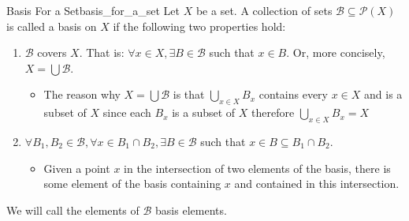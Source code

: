 \begin{definition}
{Basis For a Set}{basis_for_a_set}
Let \(X\) be a set. A collection of sets \(\mathcal{B} \subseteq
\mathcal{P}(X)\) is called a basis on \(X\) if the following two properties
hold:
\begin{enumerate}
    \item \(\mathcal{B}\) covers \(X\). That is: \(\forall x \in X, \exists B
    \in \mathcal{B}\) such that \(x \in B \). Or, more concisely, \(X = \bigcup
    \mathcal{B}\).
        \begin{itemize}
            \item The reason why \(X = \bigcup \mathcal{B} \) is that \(\bigcup
            _{x \in X} B_{x} \) contains every \(x \in X \) and is a
            subset of \(X \) since each \(B_{x} \) is a subset of \(X \)
            therefore \(\bigcup _{x \in X} B_{x} = X \)
        \end{itemize}
    \item \(\forall B_{1}, B_{2} \in \mathcal{B}, \forall x \in B_{1} \cap
    B_{2}, \exists B \in \mathcal{B}\) such that \(x \in B \subseteq B_{1} \cap
    B_{2}\).
    \begin{itemize}
        \item Given a point \(x\) in the intersection of two elements of the
        basis, there is some element of the basis containing \(x\) and contained
        in this intersection.
    \end{itemize}
\end{enumerate}
We will call the elements of \(\mathcal{B} \) basis elements.
\end{definition}
